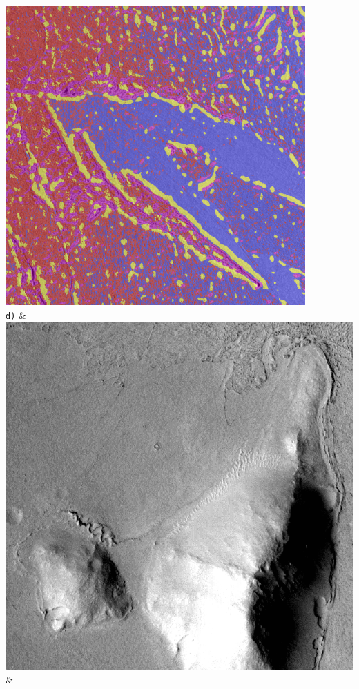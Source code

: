 \begin{table}[h!]
\begin{tabularx}{\textwidth}
		\includegraphics[width=0.9\linewidth]{images/gen/color_weight/p03_03.png_1.66.png} \\
		\texttt{d)} &
		\includegraphics[width=0.9\linewidth]{images/p03/p03_04.png} &

\end{tabularx}
\end{table}

